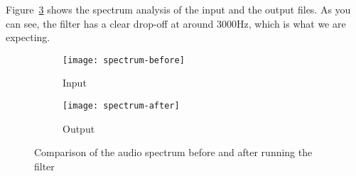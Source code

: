 
Figure~\ref{fig:simulation:spectrum} shows the spectrum analysis of the input and the output files.
As you can see, the filter has a clear drop-off at around 3000Hz, which is what we are expecting.

\begin{figure}[H]
	\centering
	\begin{subfigure}[l]{0.7\textwidth}
		\texttt{[image: spectrum-before]}
		\caption{Input}
		\label{fig:simulation:spectrum:before}
	\end{subfigure}

	\begin{subfigure}[l]{0.7\textwidth}
		\texttt{[image: spectrum-after]}
		\caption{Output}
		\label{fig:simulation:spectrum:after}
	\end{subfigure}

	\caption{Comparison of the audio spectrum before and after running the filter}
	\label{fig:simulation:spectrum}
\end{figure}


